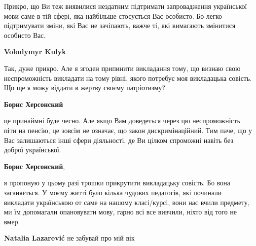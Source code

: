 \begin{itemize}
Прикро, що Ви теж виявилися нездатним підтримати запровадження української мови
саме в тій сфері, яка найбільше стосується Вас особисто. Бо легко підтримувати
зміни, які Вас не зачіпають, важче ті, які вимагають змінитися особисто Вас.

\begin{itemize}
 
\textbf{Volodymyr Kulyk} 

Так, дуже прикро. Але я згоден припинити викладання тому, що визнаю свою
неспроможність викладати на тому рівні, якого потребує моя викладацька совість.
Що ще я можу віддати в жертву своєму патріотизму?


 
\textbf{Борис Херсонский} 

це принаймні буде чесно. Але якщо Вам доведеться через цю неспроможність піти
на пенсію, це зовсім не означає, що закон дискримінаційний. Тим паче, що у Вас
залишаються інші сфери діяльності, де Ви цілком спроможні навіть без доброї
української.

 
\textbf{Борис Херсонский}, 

я пропоную у цьому разі трошки прикрутити викладацьку совість. Бо вона
заганяється. У моєму житті було кілька чудових педагогів, які починали
викладати українською от саме на нашому класі/курсі, вони нас вчили предмету,
ми їм допомагали опановувати мову, гарно всі все вивчили, ніхто від того не
вмер.


 
\textbf{Natalia Lazarević} не забувай про мій вік


\end{itemize}
\end{itemize}
